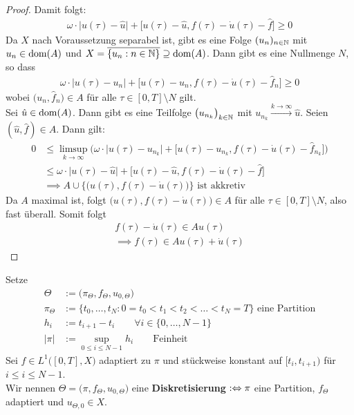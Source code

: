 \begin{proof}
	Damit folgt:
	\begin{align*}
		\omega\cdot\big|u(\tau)-\hat{u}\big|+\big[u(\tau)-\hat{u},f(\tau)-\dot{u}(\tau)-\hat{f}\big]\geq0
	\end{align*}
	Da $X$ nach Voraussetzung separabel ist, gibt es eine Folge $(u_n)_{n\in\mathbb{N}}$ mit $u_n\in\operatorname{dom}(A)$ und $X=\overline{\lbrace u_n:n\in\mathbb{N}\rbrace}\supseteq\operatorname{dom}(A)$. 
	Dann gibt es eine Nullmenge $N$, so dass
	\begin{align*}
		\omega\cdot\big|u(\tau)-u_n\big|+\big[u(\tau)-u_n,f(\tau)-\dot{u}(\tau)-\hat{f}_n\big]\geq0 
	\end{align*}
	wobei $\big(u_n,\hat{f}_n\big)\in A$ für alle $\tau\in[0,T]\setminus N$ gilt.\\
	Sei $\hat{u}\in\operatorname{dom}(A)$. Dann gibt es eine Teilfolge $\big(u_{n_k}\big)_{k\in\mathbb{N}}$ mit $u_{n_k}\stackrel{k\to\infty}{\longrightarrow}\hat{u}$. 
	Seien $(\hat{u},\hat{f})\in A$. 
	Dann gilt:
	\begin{align*}
		0&\leq\limsup\limits_{k\to\infty}\Big(\omega\cdot\big|u(\tau)-u_{n_k}\big|+\big[u(\tau)-u_{n_k},f(\tau)-\dot{u}(\tau)-\hat{f}_{n_k}\big]\Big)\\
		&\leq\omega\cdot\big|u(\tau)-\hat{u}\big|+\big[u(\tau)-\hat{u},f(\tau)-\dot{u}(\tau)-\hat{f}\big]\\
		&\implies
		A\cup\Big\lbrace\big(u(\tau),f(\tau)-\dot{u}(\tau)\big)\Big\rbrace\text{ ist akkretiv}
	\end{align*}
	Da $A$ maximal ist, folgt $\big(u(\tau),f(\tau)-\dot{u}(\tau)\big)\in A$ für alle $\tau\in[0,T]\setminus N$, also fast überall. 
	Somit folgt
	\begin{align*}
		f(\tau)-\dot{u}(\tau)\in A u(\tau)\\
		\implies f(\tau)\in A u(\tau)+\dot{u}(\tau)
	\end{align*}
\end{proof}

\begin{definition}
	Setze
	\begin{align*}
		\Theta&:=\big(\pi_\Theta,f_\Theta,u_{0,\Theta}\big)\\
		\pi_\Theta&:=\big\lbrace t_0,\ldots,t_N: 0=t_0<t_1<t_2<\ldots<t_N=T\big\rbrace\text{ eine Partition}\\
		h_i&:=t_{i+1}-t_i\qquad\forall i\in\lbrace0,\ldots,N-1\rbrace\\
		|\pi|&:=\sup\limits_{0\leq i\leq N-1} h_i\qquad\text{Feinheit}
	\end{align*}
	Sei $f\in L^1\big([0,T],X\big)$ adaptiert zu $\pi$ und stückweise konstant auf $[t_i,t_{i+1})$ für $i\leq i\leq N-1$.\\
	Wir nennen $\Theta=\big(\pi,f_\Theta,u_{0,\Theta}\big)$ eine \textbf{Diskretisierung} $:\Leftrightarrow\pi$ eine Partition, $f_\Theta$ adaptiert und $u_{\Theta,0}\in X$.
\end{definition}

